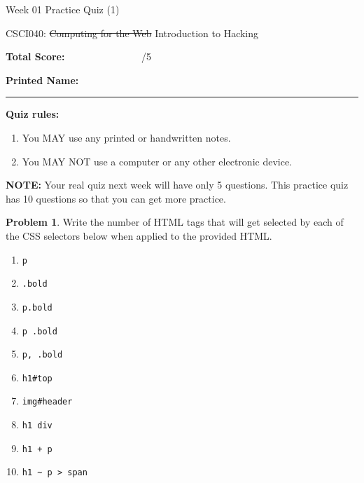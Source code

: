 \documentclass[10pt]{article}
\theoremstyle{definition}
\newtheorem{problem}{Problem}
\begin{document}
\begin{center}
    {
\Large
Week 01 Practice Quiz (1)
}

    \vspace{0.1in}
    CSCI040: \sout{Computing for the Web} Introduction to Hacking

    \vspace{0.1in}
\end{center}

\vspace{0.15in}
\noindent
\textbf{Total Score:} ~~~~~~~~~~~~~~~/5

\vspace{0.5in}
\noindent
\textbf{Printed Name:}

\noindent
\rule{\textwidth}{0.1pt}
\vspace{0.25in}

\noindent
\textbf{Quiz rules:}
\begin{enumerate}
    \item You MAY use any printed or handwritten notes.
    \item You MAY NOT use a computer or any other electronic device.
\end{enumerate}

\noindent
\textbf{NOTE:}
Your real quiz next week will have only 5 questions.
This practice quiz has 10 questions so that you can get more practice.

\vspace{0.15in}

\noindent
\begin{problem}
    Write the number of HTML tags that will get selected by each of the CSS selectors below when applied to the provided HTML.

\begin{enumerate}[before=\setlength{\baselineskip}{8mm}]

    \item
    \lstinline{p}

    \item
    \lstinline{.bold}

    \item
    \lstinline{p.bold}

    \item
    \lstinline{p .bold}

    \item
    \lstinline{p, .bold}

    \item
    \lstinline{h1#top}

    \item
    \lstinline{img#header}

    \item
    \lstinline{h1 div}

    \item
    \lstinline{h1 + p}

    \item
    \lstinline{h1 ~ p > span}

\end{enumerate}
\end{problem}
\end{document}
